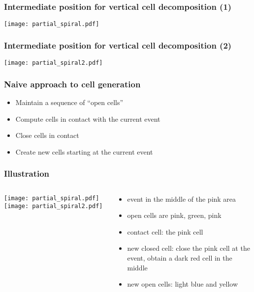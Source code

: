 \documentclass[compress]{beamer}
\begin{document}
\begin{frame}
\frametitle{Intermediate position for vertical cell decomposition (1)}
\texttt{[image: partial\_spiral.pdf]}
\end{frame}
\begin{frame}
\frametitle{Intermediate position for vertical cell decomposition (2)}
\texttt{[image: partial\_spiral2.pdf]}
\end{frame}
\begin{frame}
\frametitle{Naive approach to cell generation}
\begin{itemize}
\item Maintain a sequence of ``open cells''
\item Compute cells in contact with the current event
\item Close cells in contact
\item Create new cells starting at the current event
\end{itemize}
\end{frame}
\begin{frame}
\frametitle{Illustration}
\begin{columns}
\begin{column}{0.3\textwidth}
\texttt{[image: partial\_spiral.pdf]}
\texttt{[image: partial\_spiral2.pdf]}
\end{column}
\begin{column}{0.7\textwidth}
\begin{itemize}
\item event in the middle of the pink area
\item open cells are pink, green, pink
\item contact cell: the pink cell
\item new closed cell: close the pink cell at the event,
obtain a dark red cell in the middle
\item new open cells: light blue and yellow
\end{itemize}
\end{column}
\end{columns}
\end{frame}
\end{document}
